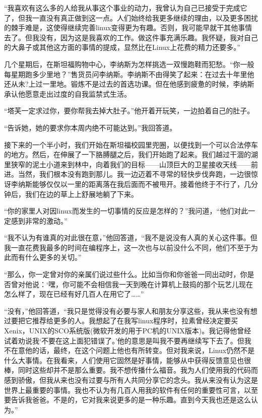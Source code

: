 “我喜欢有这么多的人给我从事这个事业的动力，我曾认为自己已接受于完成它了，但我一直没有真正做到这一点。人们始终给我更多继续的理由，以及更多困扰的棘手难是，这使得继续完善linux变得更为有趣。否则，我可能早就干其他事情去了。但我没有，因为这是我喜欢的工作。做这件事充满乐趣。我怀疑，我对自己的大鼻子或其他这方面的事情的提成，显然比在Linux上花费的精力还要多。”

几个星期后，在斯坦福购物中心，李纳斯为怎样挑选一双慢跑鞋而犯愁。“你一般每星期跑多少里地？”售货员问李纳斯。李纳斯不由得笑了起来：在过去十年里他还从未?上过一里地。锻炼不是过去的首选功课。但在他感到疲惫的时候，李纳斯承认他愿意走出过度的自我监禁式生活。

“塔芙一定求过你，要你帮我去掉大肚子。”他开着开玩笑，一边拍着自己的肚子。

“告诉她，她的要求你本周内绝不可能达到。”我回答道。

接下来的一个半小时，我们开始在斯坦福校园里兜圈，以便找到一个可以合法停车的地方。然后，在伸展了一下胳膊腿之后，我们开始跑了起来。我们越过干涸的湖里狭窄的泥土小道来到林中，向着我们的目标——山顶巨大的卫星接收天线——前进。当然，我们根本没有跑到那儿。我一边迈着不寻常的轻快步伐奔跑，一边很惊讶李纳斯能够仅仅以一里的距离落在我后面而不被甩开。接着他终于不行了，几分钟后，我们在边的草上上舒展地躺了下来。

“你的家里人对因linux而发生的一切事情的反应是怎样的？”我问道，“他们对此一定感到非常的激动。”

“我不认为有谁真的对此很在意，”他回答道，“我不是说没有人真的关心这件事。但我一直花费我最多的时间在编程序上，这一次也与以前没什么不同，他们不至于为此而有什么更多的关切。”

“那么，你一定曾对你的亲属们说过些什么。比如当你和你爸爸一同出动时，你是否曾对他说：‘嘿，你可能不会相信我一天到晚在计算机上鼓捣的那个玩艺儿现在怎么样了，现在已经有好几百人在用它了……”

“没有，”他回答道，“我只是觉得没有必要与家人和朋友分享这些，我从来也没有想过要把它推荐给更多的人。我想起了在我写linux程序时，拉素曾经决定要买Xenix，UNIX的SCO系统版(微软开发的用于PC机的UNIX版本)。我记得他曾经试着劝说我‘不要在这上面犯错误了。’他的意思是叫我不要再继续写下去了。但我不在意他的话，最终，在这个问题上他也有所转变。但对我来说，Linux仍然不是什么大事情。在我看来，人们使用它固然是好事情，能够从中获得反馈意见也很棒，同时这些却并不是那么重要。我不想传播什么福音。我为人们使用我的代码而感到骄傲，但我从来也没有过要与所有人共同分享它的念头。我从来没有认为这是世界上最重要的事情。我也不认为有几百人用我的软件有任何的重要性可言，以至要告诉我爸爸。不是的，它对我来说更多的是一种乐趣。直到今天我也还是这么认为。”

